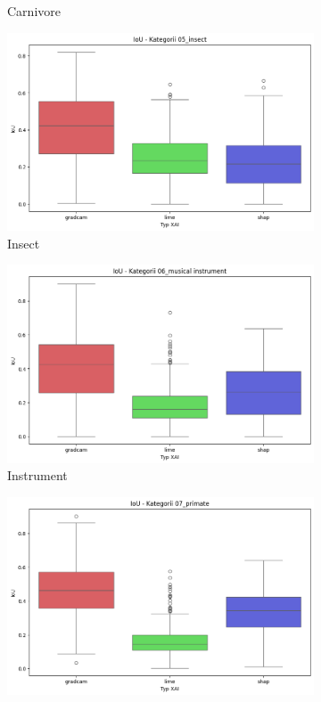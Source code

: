 \begin{figure}[h]
\begin{subfigure}[b]{0.3\textwidth}
		\caption{Carnivore}
	\end{subfigure}
	\begin{subfigure}[b]{0.3\textwidth}
		\centering\includegraphics[width=.9\textwidth]{img/base_iou_insect}
		\caption{Insect}
	\end{subfigure}
	\begin{subfigure}[b]{0.3\textwidth}
		\centering\includegraphics[width=.9\textwidth]{img/base_iou_music}
		\caption{Instrument}
	\end{subfigure}
	\begin{subfigure}[b]{0.3\textwidth}
		\centering\includegraphics[width=.9\textwidth]{img/base_iou_primate}

\end{subfigure}
\end{figure}
